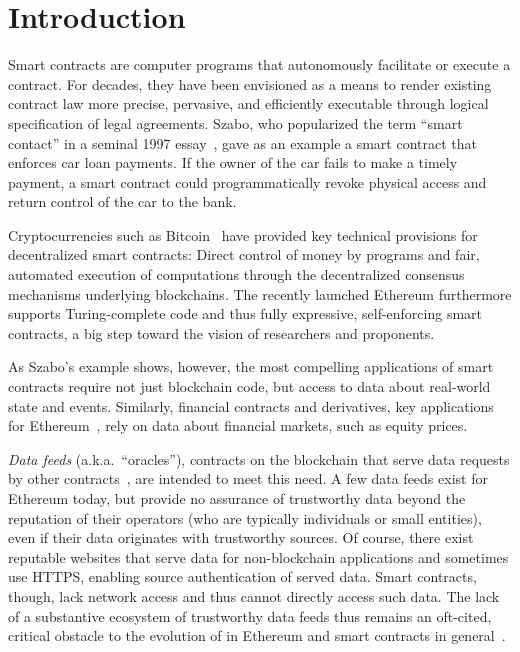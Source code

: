 \vspace{-2mm}
\section{Introduction}
\vspace{-2mm}

Smart contracts are computer programs that autonomously facilitate or execute a contract. For decades, they have been envisioned as a means to  render existing contract law more precise, pervasive, and efficiently executable through logical specification of legal agreements. Szabo, who popularized the term ``smart contact'' in a seminal 1997 essay~\cite{szabosmartcontract}, gave as an example a smart contract that enforces car loan payments. If the owner of the car fails to make a timely payment, a smart contract could programmatically revoke physical access and return control of the car to the bank. %

Cryptocurrencies such as Bitcoin~\cite{bitcoin} have provided key technical provisions for decentralized smart contracts: Direct control of money by programs and fair, automated execution of computations through the decentralized consensus mechanisms underlying  blockchains. 
The recently launched Ethereum furthermore supports Turing-complete code and thus fully expressive, self-enforcing smart contracts, a big step toward the vision of researchers and proponents.  

As Szabo's example shows, however, the most compelling applications of smart contracts require not just blockchain code, but access to data about real-world state and events. Similarly, financial contracts and derivatives, key applications for Ethereum~\cite{yellowpaper,whitepaper}, rely on data about financial markets, such as equity prices. %

\emph{Data feeds} (a.k.a.~``oracles''), contracts on the blockchain that serve data requests by other contracts~\cite{whitepaper,yellowpaper}, are intended to meet this need. A few data feeds exist for Ethereum today, but provide no assurance of trustworthy data beyond the reputation of their operators (who are typically individuals or small entities), even if their data originates with trustworthy sources. Of course, there exist reputable websites that serve data for non-blockchain applications and sometimes use HTTPS, enabling source authentication of served data. Smart contracts, though, lack network access and thus cannot directly access such data. The lack of a substantive ecosystem of trustworthy data feeds thus remains an oft-cited, critical obstacle to the evolution of in Ethereum and smart contracts 
in general~\cite{commblockstream}.

